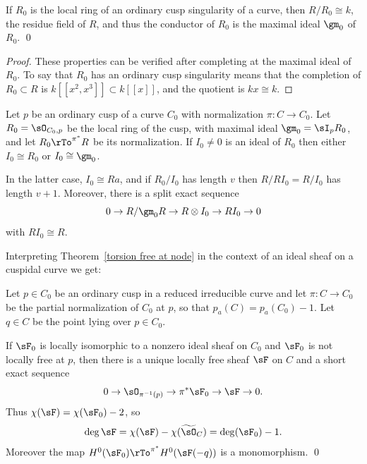 \begin{proposition}\label{conductor of node and cusp}
If $R_{0}$ is the local ring of an ordinary cusp singularity of a curve, then  $R/R_{0} \cong k$, the residue field of $R$, and thus the conductor of $R_{0}$ is the
maximal ideal $\gm_{0}$ of $R_{0}$. \qed
\end{proposition}

\begin{proof} These properties can be verified after completing at the maximal ideal of $R_{0}$.
To say 
%
that $R_0$ has an ordinary cusp singularity means that the completion of 
$R_0 \subset R$ is $k[[x^2,x^3]]\subset k[[x]]$, and the quotient is $kx \cong k$.
\end{proof}


\begin{theorem}\label{torsion free at node}
Let $p$ be an ordinary cusp of a curve $C_0$ with normalization $\pi: C \to C_0$. Let $R_0 = \sO_{C_0,p}$ be the local ring of the cusp, with maximal ideal $\gm_0 = \sI_{p}R_{0}$,
and let $R_{0}\rTo^{\pi^{*}} R$ be its normalization.  If $I_{0}\neq 0$ is an ideal of $R_{0}$ then 
either $I_{0}\cong R_{0}$ or $I_{0}\cong \gm_0$.

 In the latter case, $I_{0} \cong Ra$, and if $R_{0}/I_{0}$ has length $v$ then $R/RI_{0} = R/I_{0}$ has length $v+1$.
 Moreover,
there is a split exact sequence
$$
0\to R/\gm_0 R \to R \otimes I_{0}  \to R I_{0} \to 0
$$
with $RI_{0}  \cong R$.
\end{theorem}

Interpreting Theorem~\ref{torsion free at node} in the context of an ideal sheaf on a cuspidal curve
we get:

\begin{corollary}
Let $p\in C_{0}$ be an ordinary cusp in a reduced irreducible curve and let $\pi:C \to C_{0}$ be 
the partial normalization of $C_{0}$ at $p$, so that $p_a(C) = p_a(C_{0}) -1$.
Let $q\in C$ be the point lying over $p\in C_{0}$.

If $\sF_0$ is locally
isomorphic to a nonzero ideal sheaf on $C_{0}$
and $\sF_0$ is not locally free at $p$, then there is 
a unique locally free sheaf $\sF$ on $C$ and a short exact sequence
$$
0\to \sO_{\pi^{-1}(p)} \to \pi^{*} \sF_{0} \to \sF \to 0.
$$
Thus $\chi(\sF) = \chi(\sF_{0}) -2$, so 
$$
\deg \sF = \chi(\sF) - \chi(\widetilde \sO_{C}) = 
\deg(\sF_{0})-1.
$$
Moreover the map $H^{0}(\sF_{0}) \rTo^{\pi^{*}} H^{0}(\sF(-q))$ is a monomorphism. 
\qed
\end{corollary}

